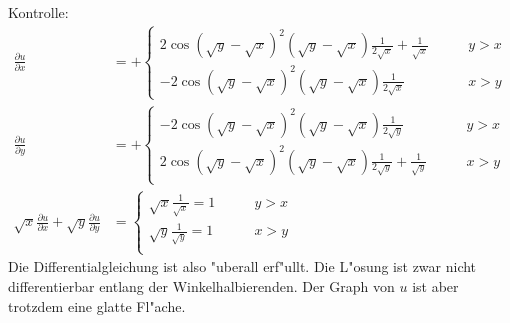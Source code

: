 \begin{loesung}
Kontrolle:
\begin{align*}
\frac{\partial u}{\partial x}
&=
+\begin{cases}
2\cos(\sqrt{y}-\sqrt{x})^2(\sqrt{y}-\sqrt{x})\frac1{2\sqrt{x}}
+\frac1{\sqrt{x}}&\qquad y> x\\
-2\cos(\sqrt{y}-\sqrt{x})^2(\sqrt{y}-\sqrt{x})\frac1{2\sqrt{x}}
&\qquad x> y
\end{cases}
\\
\frac{\partial u}{\partial y}
&=
+\begin{cases}
-2\cos(\sqrt{y}-\sqrt{x})^2(\sqrt{y}-\sqrt{x})\frac1{2\sqrt{y}}
&\qquad y> x\\
2\cos(\sqrt{y}-\sqrt{x})^2(\sqrt{y}-\sqrt{x})\frac1{2\sqrt{y}}
+\frac1{\sqrt{y}}&\qquad x> y\\
\end{cases}
\\
\sqrt{x}
\frac{\partial u}{\partial x}
+
\sqrt{y}
\frac{\partial u}{\partial y}
&=
\begin{cases}
\sqrt{x}\frac1{\sqrt{x}}=1&\qquad y> x\\
\sqrt{y}\frac1{\sqrt{y}}=1&\qquad x> y\\
\end{cases}
\end{align*}
Die Differentialgleichung ist also "uberall erf"ullt. Die L"osung ist
zwar nicht differentierbar entlang der
Winkelhalbierenden. Der Graph von $u$ ist aber trotzdem eine
glatte Fl"ache.
\end{loesung}
